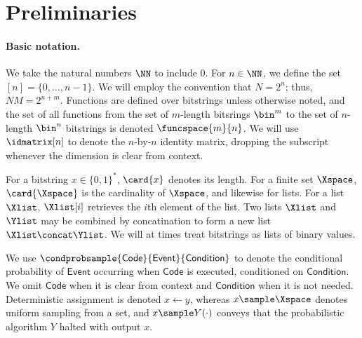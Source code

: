 \section{Preliminaries}\label{sec:prelim}
  \paragraph{Basic notation.}
    We take the natural numbers $\NN$ to include $0$. For $n \in \NN$, we
      define the set $[n] = \{0, \dots, n-1\}$. We will employ the
      convention that $N = 2^n$; thus, $NM = 2^{n+m}$.
      Functions are defined over bitstrings unless otherwise noted, and the set
      of all functions from the set of $m$-length bitsrings $\bin^m$ to the
      set of $n$-length $\bin^n$ bitstrings is denoted $\funcspace{m}{n}$.
      We will use $\idmatrix[n]$ to denote the $n$-by-$n$ identity matrix, dropping
      the subscript whenever the dimension is clear from context.

    For a bitstring $x\in\{0,1\}^*$, $\card{x}$ denotes its length.
      For a finite set $\Xspace$, $\card{\Xspace}$ is the cardinality of
      $\Xspace$, and likewise for lists. 
      For a list $\Xlist$, $\Xlist[i]$ retrieves the $i$th element of the list.
      Two lists $\Xlist$ and $\Ylist$ may be combined by concatination to form
      a new list $\Xlist \concat \Ylist$. We will at times treat bitstrings as
      lists of binary values.

    We use $\condprobsample{\mathsf{Code}}{\mathsf{Event}}{\mathsf{Condition}}$
      to denote the conditional probability of $\mathsf{Event}$ occurring
      when $\mathsf{Code}$ is executed, conditioned on $\mathsf{Condition}$.
      We omit $\mathsf{Code}$ when it is clear from context and
      $\mathsf{Condition}$ when it is not needed. 
      Deterministic assignment is denoted $x \gets y$, whereas
      $x \sample \Xspace$ denotes uniform sampling from a set,
      and $x \sample Y(\cdot)$ conveys that the probabilistic algorithm $Y$ halted
      with output $x$. 



